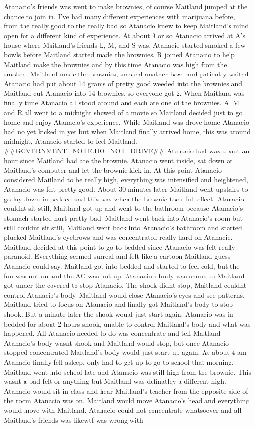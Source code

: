 \documentclass[12pt]{book}
\begin{document}
Atanacio's friends was went to make brownies, of course Maitland jumped at the chance to join in. I've had many different experiences with marijuana before, from the really good to the really bad so Atanacio knew to keep Maitland's mind open for a different kind of experience. At about 9 or so Atanacio arrived at A's house where Maitland's friends L, M, and S was. Atanacio started smoked a few bowls before Maitland started made the brownies. R joined Atanacio to help Maitland make the brownies and by this time Atanacio was high from the smoked. Maitland made the brownies, smoked another bowl and patiently waited. Atanacio had put about 14 grams of pretty good weeded into the brownies and Maitland cut Atanacio into 14 brownies, so everyone got 2. When Maitland was finally time Atanacio all stood around and each ate one of the brownies. A, M and R all went to a midnight showed of a movie so Maitland decided just to go home and enjoy Atanacio's experience. While Maitland was drove home Atanacio had no yet kicked in yet but when Maitland finally arrived home, this was around midnight, Atanacio started to feel Maitland. \#\#GOVERNMENT\_NOTE:DO\_NOT\_DRIVE\#\# Atanacio had was about an hour since Maitland had ate the brownie. Atanacio went inside, sat down at Maitland's computer and let the brownie kick in. At this point Atanacio considered Maitland to be really high, everything was intensified and heightened, Atanacio was felt pretty good. About 30 minutes later Maitland went upstairs to go lay down in bedded and this was when the brownie took full effect. Atanacio couldnt sit still, Maitland got up and went to the bathroom because Atanacio's stomach started hurt pretty bad. Maitland went back into Atanacio's room but still couldnt sit still, Maitland went back into Atanacio's bathroom and started plucked Maitland's eyebrows and was concentrated really hard on Atanacio. Maitland decided at this point to go to bedded since Atanacio was felt really paranoid. Everything seemed surreal and felt like a cartoon Maitland guess Atanacio could say. Maitland got into bedded and started to feel cold, but the fan was not on and the AC was not up. Atanacio's body was shook so Maitland got under the covered to stop Atanacio. The shook didnt stop, Maitland couldnt control Atanacio's body. Maitland would close Atanacio's eyes and see patterns, Maitland tried to focus on Atanacio and finally got Maitland's body to stop shook. But a minute later the shook would just start again. Atanacio was in bedded for about 2 hours shook, unable to control Maitland's body and what was happened. All Atanacio needed to do was concentrate and tell Maitland Atanacio's body wasnt shook and Maitland would stop, but once Atanacio stopped concentrated Maitland's body would just start up again. At about 4 am Atanacio finally fell asleep, only had to get up to go to school that morning. Maitland went into school late and Atanacio was still high from the brownie. This wasnt a bad felt or anything but Maitland was definatley a different high. Atanacio would sit in class and hear Maitland's teacher from the opposite side of the room Atanacio was on. Maitland would move Atanacio's head and everything would move with Maitland. Atanacio could not concentrate whatsoever and all Maitland's friends was likewtf was wrong with 
\end{document}

